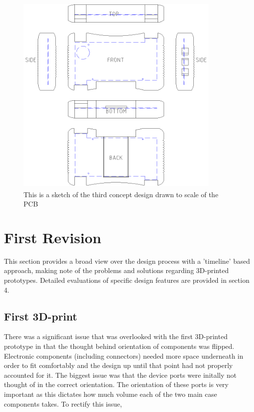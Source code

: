 \begin{figure}[hbt!]
\centering
\includegraphics[width=10cm,height=10cm,keepaspectratio]{Figures/design3_sketch.png}
\caption{This is a sketch of the third concept design drawn to scale of the PCB}
\label{fig:Design_3}
\end{figure}

\section{First Revision}
This section provides a broad view over the design process with a 'timeline' based approach, making note of the problems and solutions regarding 3D-printed prototypes.
Detailed evaluations of specific design features are provided in section 4.

\subsection{First 3D-print}

There was a significant issue that was overlooked with the first 3D-printed prototype in that the thought behind orientation of components was flipped.
Electronic components (including connectors) needed more space underneath in order to fit comfortably and the design up until that point had not properly accounted for it.
The biggest issue was that the device ports were initally not thought of in the correct orientation.
The orientation of these ports is very important as this dictates how much volume each of the two main case components takes.
To rectify this issue, %

